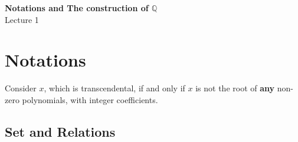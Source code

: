\documentclass[12pt]{article}
\theoremstyle{definition}
\theoremstyle{plain}
\begin{document}

\begin{center}
    {\Large \textbf{Notations and The construction of $\mathbb{Q}$}}\\[0.5em]
    {\large Lecture 1}
\end{center}

\tableofcontents

\newpage


%

\section{Notations}

%

\begin{note}
Consider $x$, which is transcendental, if and only if $x$ is not the root of \textbf{any} non-zero polynomials, with integer coefficients.
\end{note}

\subsection{Set and Relations}

\end{document}
